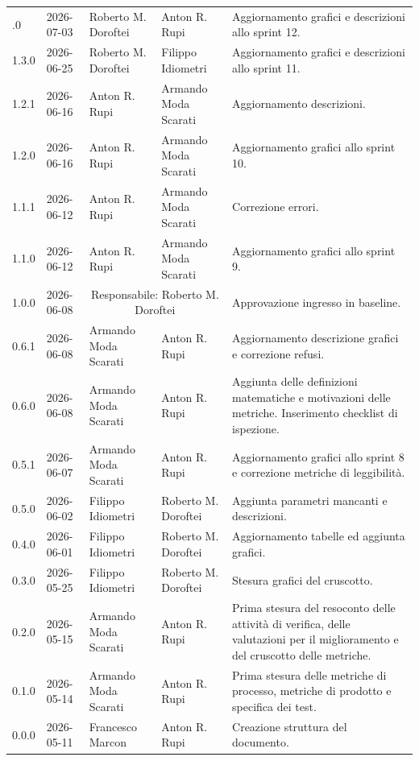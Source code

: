 \begin{longtable}{>{\ttfamily\small}l l l l p{4cm}}
	\bottomrule
	\endlastfoot
	1.4.0 & 2026-07-03 & {Roberto M. Doroftei} & {Anton R. Rupi} & Aggiornamento grafici e descrizioni allo sprint 12. \\
	1.3.0 & 2026-06-25 & {Roberto M. Doroftei} & {Filippo Idiometri} & Aggiornamento grafici e descrizioni allo sprint 11. \\
	1.2.1 & 2026-06-16 & {Anton R. Rupi} & {Armando Moda Scarati} & Aggiornamento descrizioni. \\
	1.2.0 & 2026-06-16 & {Anton R. Rupi} & {Armando Moda Scarati} & Aggiornamento grafici allo sprint 10. \\
	1.1.1 & 2026-06-12 & {Anton R. Rupi} & {Armando Moda Scarati} & Correzione errori. \\
	1.1.0 & 2026-06-12 & {Anton R. Rupi} & {Armando Moda Scarati} & Aggiornamento grafici allo sprint 9. \\
	1.0.0 & 2026-06-08 & \multicolumn{2}{c}{Responsabile: Roberto M. Doroftei} & Approvazione ingresso in baseline. \\
	0.6.1 & 2026-06-08 & {Armando Moda Scarati} & {Anton R. Rupi} & Aggiornamento descrizione grafici e correzione refusi. \\
	0.6.0 & 2026-06-08 & {Armando Moda Scarati} & {Anton R. Rupi} & Aggiunta delle definizioni matematiche e motivazioni delle metriche. Inserimento checklist di ispezione. \\
	0.5.1 & 2026-06-07 & {Armando Moda Scarati} & {Anton R. Rupi} & Aggiornamento grafici allo sprint 8 e correzione metriche di leggibilità. \\
	0.5.0 & 2026-06-02 & {Filippo Idiometri} & {Roberto M. Doroftei} & Aggiunta parametri mancanti e descrizioni. \\
	0.4.0 & 2026-06-01 & {Filippo Idiometri} & {Roberto M. Doroftei} & Aggiornamento tabelle ed aggiunta grafici. \\
	0.3.0 & 2026-05-25 & {Filippo Idiometri} & {Roberto M. Doroftei} & Stesura grafici del cruscotto. \\
	0.2.0 & 2026-05-15 & {Armando Moda Scarati} & {Anton R. Rupi} & Prima stesura del resoconto delle attività di verifica, delle valutazioni per il miglioramento e del cruscotto delle metriche. \\
	0.1.0 & 2026-05-14 & {Armando Moda Scarati} & {Anton R. Rupi} & Prima stesura delle metriche di processo, metriche di prodotto e specifica dei test. \\
	0.0.0 & 2026-05-11 & {Francesco Marcon} & {Anton R. Rupi} & Creazione struttura del documento. \\
\end{longtable}